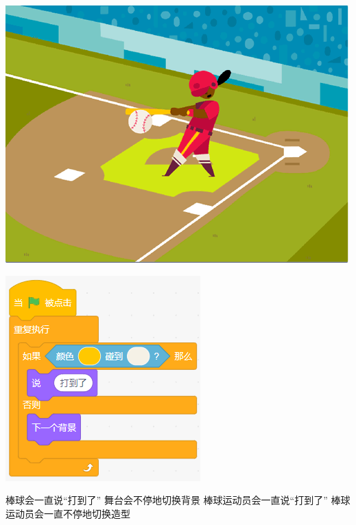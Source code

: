 \documentclass[10pt, a4paper]{article}
\begin{document}
\begin{enumerate}
        \begin{minipage}{.25\textwidth}
            \includegraphics[width=.8\textwidth]{figure/14-1.png}
        \end{minipage}
        \begin{minipage}{.25\textwidth}
            \includegraphics[width=.6\textwidth]{figure/14-2.png}
        \end{minipage}
        \begin{minipage}{.4\textwidth}
            \begin{tasks}
                \task 棒球会一直说“打到了”
                \task 舞台会不停地切换背景
                \task 棒球运动员会一直说“打到了”
                \task 棒球运动员会一直不停地切换造型
            \end{tasks}
        \end{minipage}


\end{enumerate}
\end{document}
